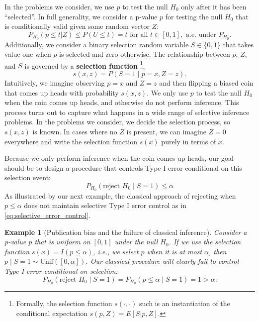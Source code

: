 \documentclass{article}
\newtheorem{example}{Example}
\begin{document}
In the problems we consider, we use $p$ to test the null $H_0$ only after it has been ``selected''. In full generality, we consider a p-value $p$ for testing the null $H_0$ that is conditionally valid given some random vector $Z$:
\begin{equation}
    \label{eq:valid_given_z}
    P_{H_0}(p \leq t | Z) \leq P(U \leq t)  = t \text{ for all } t \in [0, 1],  \text{ a.e. under } P_{H_0}.
\end{equation}
Additionally, we consider a binary selection random variable $S \in \{0, 1\}$ that takes value one when $p$ is selected and zero otherwise. The relationship between $p$, $Z$, and $S$ is governed by a \textbf{selection function} \footnote{Formally, the selection function $s(\cdot, \cdot)$ such is an instantiation of the conditional expectation $s(p, Z) = E[S|p , Z ]$. },
\begin{equation*}
    s(x, z) = P(S = 1 \mid p = x, Z = z).
\end{equation*}
Intuitively, we imagine observing $p=x$ and $Z=z$ and then flipping a biased coin that comes up heads with probability $s(x, z)$. We only use $p$ to test the null $H_0$ when the coin comes up heads, and otherwise do not perform inference. This process turns out to capture what happens in a wide range of selective inference problems. In the problems we consider, we decide the selection process, so $s(x, z)$ is known. In cases where no $Z$ is present, we can imagine $Z=0$ everywhere and write the selection function $s(x)$ purely in terms of $x$. 

Because we only perform inference when the coin comes up heads, our goal should be to design a procedure that controls Type I error conditional on this selection event:
\begin{equation}
    \label{eq:selective_error_control}
    P_{H_0}(\text{reject } H_0 \mid S = 1) \leq \alpha 
\end{equation}
As illustrated by our next example, the classical approach of rejecting when $p \leq \alpha$ does not maintain selective Type I error control as in \eqref{eq:selective_error_control}. 

\begin{example}[Publication bias and the failure of classical inference]
\label{exm:publication_bias}
Consider a p-value $p$ that is uniform on $[0, 1]$ under the null $H_0$. If we use the selection function $s(x) = I(p \leq \alpha)$, i.e., we select $p$ when it is at most $\alpha$, then $p \mid S=1 \sim \text{Unif}([0, \alpha])$. Our classical procedure will clearly fail to control Type I error conditional on selection:
\begin{equation*}
    P_{H_0}(\text{reject } H_0 \mid S=1) = P_{H_0}(p \leq \alpha \mid S=1) = 1 > \alpha. 
\end{equation*}
\end{example}
\end{document}
